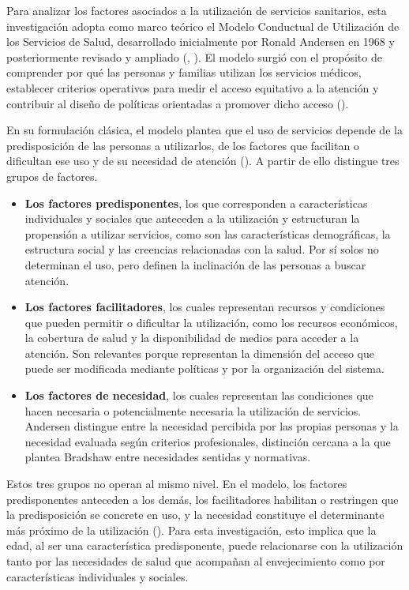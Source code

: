 \documentclass[
  spanish,
  a4paper,
  oneside]{scrbook}
\begin{document}
Para analizar los factores asociados a la utilización de servicios
sanitarios, esta investigación adopta como marco teórico el Modelo
Conductual de Utilización de los Servicios de Salud, desarrollado
inicialmente por Ronald Andersen en 1968 y posteriormente revisado y
ampliado (,
). El modelo surgió con el
propósito de comprender por qué las personas y familias utilizan los
servicios médicos, establecer criterios operativos para medir el acceso
equitativo a la atención y contribuir al diseño de políticas orientadas
a promover dicho acceso ().

En su formulación clásica, el modelo plantea que el uso de servicios
depende de la predisposición de las personas a utilizarlos, de los
factores que facilitan o dificultan ese uso y de su necesidad de
atención (). A
partir de ello distingue tres grupos de factores.

\begin{itemize}
\item
  \textbf{Los factores predisponentes}, los que corresponden a
  características individuales y sociales que anteceden a la utilización
  y estructuran la propensión a utilizar servicios, como son las
  características demográficas, la estructura social y las creencias
  relacionadas con la salud. Por sí solos no determinan el uso, pero
  definen la inclinación de las personas a buscar atención.
\item
  \textbf{Los factores facilitadores}, los cuales representan recursos y
  condiciones que pueden permitir o dificultar la utilización, como los
  recursos económicos, la cobertura de salud y la disponibilidad de
  medios para acceder a la atención. Son relevantes porque representan
  la dimensión del acceso que puede ser modificada mediante políticas y
  por la organización del sistema.
\item
  \textbf{Los factores de necesidad}, los cuales representan las
  condiciones que hacen necesaria o potencialmente necesaria la
  utilización de servicios. Andersen distingue entre la necesidad
  percibida por las propias personas y la necesidad evaluada según
  criterios profesionales, distinción cercana a la que plantea Bradshaw
  entre necesidades sentidas y normativas.
\end{itemize}

Estos tres grupos no operan al mismo nivel. En el modelo, los factores
predisponentes anteceden a los demás, los facilitadores habilitan o
restringen que la predisposición se concrete en uso, y la necesidad
constituye el determinante más próximo de la utilización
().
Para esta investigación, esto implica que la edad, al ser una
característica predisponente, puede relacionarse con la utilización
tanto por las necesidades de salud que acompañan al envejecimiento como
por características individuales y sociales.
\end{document}
